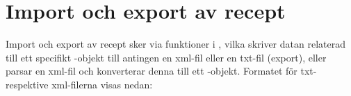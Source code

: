 \section{Import och export av recept}
Import och export av recept sker via funktioner i \Shell, vilka skriver datan relaterad till ett specifikt \Recipe-objekt till antingen en xml-fil eller en txt-fil (export), eller parsar en xml-fil och konverterar denna till ett \Recipe-objekt. Formatet för txt- respektive xml-filerna visas nedan:

\begin{framed}

\end{framed}

\begin{framed}

\end{framed}

\begin{framed}

\end{framed}
